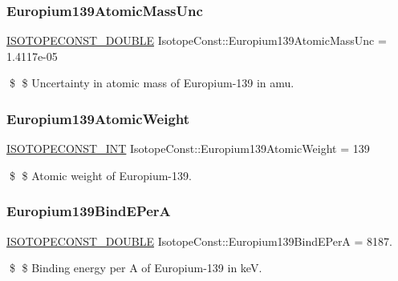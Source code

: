 \subsubsection{\texorpdfstring{Europium139\+Atomic\+Mass\+Unc}{Europium139AtomicMassUnc}}
{\footnotesize\ttfamily \mbox{\hyperlink{group___isotope_const-_macros_ga8f45a7272ce02c0b4c65c44636ed719a}{I\+S\+O\+T\+O\+P\+E\+C\+O\+N\+S\+T\+\_\+\+D\+O\+U\+B\+LE}} Isotope\+Const\+::\+Europium139\+Atomic\+Mass\+Unc = 1.\+4117e-\/05}

\$ \$ Uncertainty in atomic mass of Europium-\/139 in amu. \mbox{\label{group___isotope_const-_europium-_eu139_ga860aad02e2db25347fb8cb351b855322}} 
\subsubsection{\texorpdfstring{Europium139\+Atomic\+Weight}{Europium139AtomicWeight}}
{\footnotesize\ttfamily \mbox{\hyperlink{group___isotope_const-_macros_ga5f18360b3e99483a35c32d789e62621c}{I\+S\+O\+T\+O\+P\+E\+C\+O\+N\+S\+T\+\_\+\+I\+NT}} Isotope\+Const\+::\+Europium139\+Atomic\+Weight = 139}

\$ \$ Atomic weight of Europium-\/139. \mbox{\label{group___isotope_const-_europium-_eu139_gaff85e233baab358d86b763068267defe}} 
\subsubsection{\texorpdfstring{Europium139\+Bind\+E\+PerA}{Europium139BindEPerA}}
{\footnotesize\ttfamily \mbox{\hyperlink{group___isotope_const-_macros_ga8f45a7272ce02c0b4c65c44636ed719a}{I\+S\+O\+T\+O\+P\+E\+C\+O\+N\+S\+T\+\_\+\+D\+O\+U\+B\+LE}} Isotope\+Const\+::\+Europium139\+Bind\+E\+PerA = 8187.}

\$ \$ Binding energy per A of Europium-\/139 in keV. \mbox{\label{group___isotope_const-_europium-_eu139_ga5e7fd606450bb92d3938d4361c744830}} 
